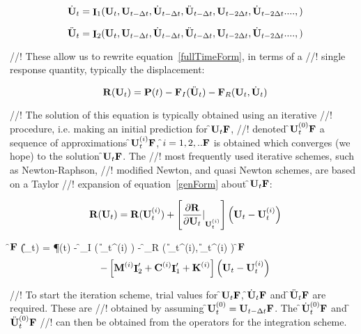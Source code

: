 \begin{equation} 
\dot {{\bf U}}_{t} = {\mathop{\cal {\bf I}}}_1 ({\bf U}_t, {\bf U}_{t-\Delta t}, \dot {{\bf U}}_{t-\Delta t},
\ddot {{\bf U}}_{t - \Delta t}, {\bf U}_{t - 2\Delta t}, \dot {{\bf U}}_{t - 2 \Delta t}. ..., )
\label{I1}
\end{equation} 

\begin{equation} 
\ddot {{\bf U}}_{t} = {\mathop{\cal {\bf I}}}_2 ({\bf U}_t, {\bf U}_{t-\Delta t}, \dot {{\bf U}}_{t-\Delta t},
\ddot {{\bf U}}_{t - \Delta t}, {\bf U}_{t - 2\Delta t}, \dot {{\bf U}}_{t - 2 \Delta t}. ..., )
\label{I2}
\end{equation} 

//! These allow us to rewrite equation~\ref{fullTimeForm}, in terms of a
//! single response quantity, typically the displacement:

\begin{equation}
{\bf R}({\bf U}_t) = {\bf P}(t) - {\bf F}_I(\ddot{\bf U}_t) - {\bf F}_R({\bf U}_t, \dot{\bf U}_t)
\label{genForm}
\end{equation}

//! The solution of this equation is typically obtained using an iterative
//! procedure, i.e. making an initial prediction for \f${\bf U}_{t}{\bf F}$,
//! denoted \f${\bf U}_{t}^{(0)}{\bf F}$ a sequence of approximations \f${\bf U}_{t}^{(i)}{\bf F}$,
\f$i=1,2, ..{\bf F}$ is obtained which converges (we hope) to the solution \f${\bf U}_{t}{\bf F}$. The
//! most frequently used iterative schemes, such as Newton-Raphson,
//! modified Newton, and quasi Newton schemes, are based on a Taylor
//! expansion of equation~\ref{genForm} about \f${\bf U}_{t}{\bf F}$:    

\begin{equation} 
{\bf R}({\bf U}_{t}) = 
{\bf R}({\bf U}_{t}^{(i)}) +
\left[ {\frac{\partial {\bf R}}{\partial {\bf U}_t} \vert}_{{\bf U}_{t}^{(i)}}\right]
\left( {\bf U}_{t} - {\bf U}_{t}^{(i)} \right) 
\end{equation}

\f${\bf F}$
\R(\U_{t}) = 
 \P (t) 
 - \f_{I} \left( \ddot \U_{t}^{(i)} \right) -
\f_{R} \left( \dot \U_{t}^{(i)}, \U_{t}^{(i)} \right)
\f${\bf F}$
\begin{equation} 
- \left[
   {\bf M}^{(i)} {\mathop{\cal {\bf I}}}_2'
+  {\bf C}^{(i)} {\mathop{\cal {\bf I}}}_1'
+ {\bf K}^{(i)}  \right]
 \left( {\bf U}_{t} - {\bf U}_{t}^{(i)} \right)
\label{femGenFormTaylor}
\end{equation} 

//! To start the iteration scheme, trial values for \f${\bf U}_{t}{\bf F}$, \f$\dot
{{\bf U}}_{t} {\bf F}$ and \f$\ddot {{\bf U}}_{t} {\bf F}$ are required. These are
//! obtained by assuming \f${\bf U}_{t}^{(0)} = {\bf U}_{t-\Delta t}{\bf F}$. The
\f$\dot {{\bf U}}_{t}^{(0)} {\bf F}$ and \f$\ddot {{\bf U}}_{t}^{(0)}{\bf F}$
//! can then be obtained from the operators for the integration scheme.

